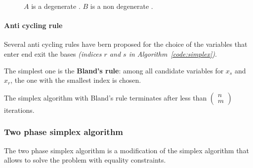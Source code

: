 \documentclass[english]{article}
\begin{document}
\begin{figure}[htbp]
  \bigskip
  \centering
  \caption{\(A\) is a degenerate \BFS. \(B\) is a non degenerate \BFS.}
  \label{fig:degenerate-solutions}
  \centering
\end{figure}

\paragraph{Anti cycling rule}

Several anti cycling rules have bern proposed for the choice of the variables that enter end exit the bases \textit{(indices \(r\) and \(s\) in Algorithm~\ref{code:simplex})}.

The simplest one is the \textbf{Bland's rule}: among all candidate variables for \(x_s\) and \(x_r\), the one with the smallest index is chosen.

\begin{property}
  The simplex algorithm with Bland's rule terminates after less than \(\begin{pmatrix}
    n \\ m
  \end{pmatrix}\) iterations.
\end{property}

\subsubsection{Two phase simplex algorithm}

The two phase simplex algorithm is a modification of the simplex algorithm that allows to solve the \LP problem with equality
constraints.
\end{document}

